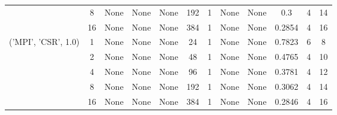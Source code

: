 \begin{tabular}{cccccccccccc}
& 8& None& None& None& 192& 1& None& None& 0.3& 4& 14\\
& 16& None& None& None& 384& 1& None& None& 0.2854& 4& 16\\
\hline
\multirow{5}{*}{('MPI', 'CSR', 1.0)}& 1& None& None& None& 24& 1& None& None& 0.7823& 6& 8\\
& 2& None& None& None& 48& 1& None& None& 0.4765& 4& 10\\
& 4& None& None& None& 96& 1& None& None& 0.3781& 4& 12\\
& 8& None& None& None& 192& 1& None& None& 0.3062& 4& 14\\
& 16& None& None& None& 384& 1& None& None& 0.2846& 4& 16\\
\hline
\end{tabular}




